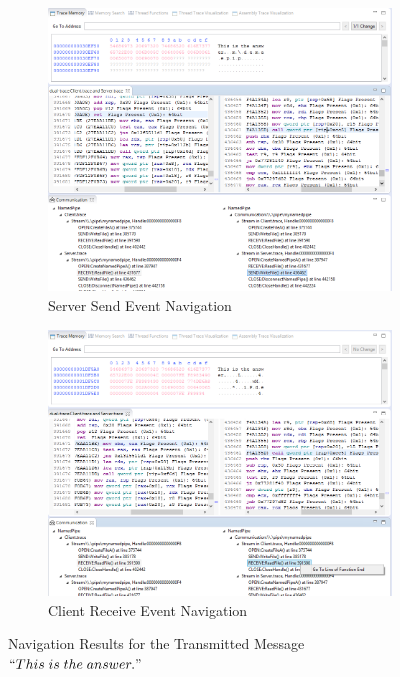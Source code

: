 \begin{figure}[H]
\begin{subfigure}[H]{0.45\linewidth}
\includegraphics[scale=0.35]{Figures/result1_server_send}
 \caption{Server Send Event Navigation}
\label{result1_server_send}
\end{subfigure}
\hfill
\begin{subfigure}[H]{0.45\linewidth}
\includegraphics[scale=0.35]{Figures/result1_client_read}
 \caption{Client Receive Event Navigation}
\label{result1_client_read}
\end{subfigure}%
\caption{Navigation Results for the Transmitted Message $``This\; is\; the\; answer."$}
\label{result1_server_to_client}
\end{figure}

